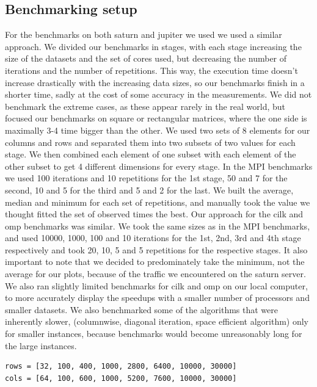 \documentclass[11pt]{article}
\begin{document}
\subsection{Benchmarking setup}
For the benchmarks on both saturn and jupiter we used we used a similar approach. We divided our benchmarks in stages, with each stage increasing the size of the datasets and the set of cores used, 
but decreasing the number of iterations and the number of repetitions. This way, the execution time doesn't increase drastically with the increasing data sizes, so our benchmarks finish in a shorter time, 
sadly at the cost of some accuracy in the measurements. We did not benchmark the extreme cases, as these appear rarely in the real world, but focused our benchmarks on square or rectangular matrices, where the one side
is maximally 3-4 time bigger than the other. We used two sets of 8 elements for our columns and rows and separated them into two subsets of two values for each stage. We then combined each element of one subset with each element of the
other subset to get 4 different dimensions for every stage. In the MPI benchmarks we used 100 iterations and 10 repetitions for the 1st stage, 50 and 7 for the second, 10 and 5 for the third and 5 and 2 for the last. We built the average, 
median and minimum for each set of repetitions, and manually took the value we thought fitted the set of observed times the best. Our approach for the cilk and omp benchmarks was similar. We took the same sizes as in the MPI benchmarks, and used
10000, 1000, 100 and 10 iterations for the 1st, 2nd, 3rd and 4th stage respectively and took 20, 10, 5 and 5 repetitions for the respective stages. It also important to note that we decided to predominately take the minimum, not the average for our
plots, because of the traffic we encountered on the saturn server.
We also ran slightly limited benchmarks for cilk and omp on our local computer, to more accurately 
display the speedups with a smaller number of processors and smaller datasets. We also benchmarked some of the algorithms that were inherently slower, (columnwise, diagonal iteration, space efficient algorithm) only for smaller instances, because
benchmarks would become unreasonably long for the large instances.
\begin{lstlisting}[label=some-code, caption=The two sets of sizes used for the rows and columns]
rows = [32, 100, 400, 1000, 2800, 6400, 10000, 30000]
cols = [64, 100, 600, 1000, 5200, 7600, 10000, 30000]
\end{lstlisting}
\end{document}
